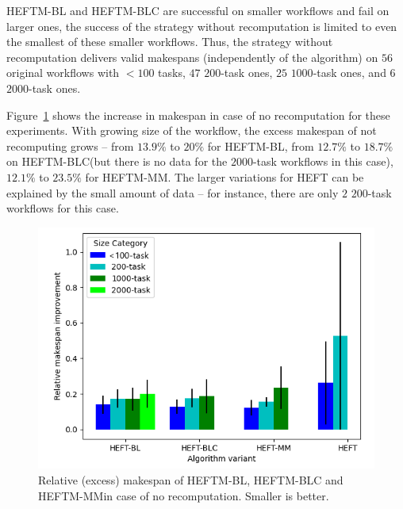 \documentclass[conference]{IEEEtran}
\newcommand{\algo}[1]{\textsc{#1}}
\newcommand{\heft}{\algo{HEFT}\xspace}
\newcommand{\heftmm}{\algo{HEFTM-MM}\xspace}
\newcommand{\heftbl}{\algo{HEFTM-BL}\xspace}
\newcommand{\heftblc}{\algo{HEFTM-BLC}\xspace}
\newcommand{\new}[1]{{\color{blue}#1}}
\begin{document}
\heftbl and \heftblc are successful on smaller workflows and fail on larger ones, 
the success of the strategy without recomputation is limited to even the smallest of these smaller workflows.
Thus, the strategy without recomputation delivers valid makespans (independently of the algorithm) 
on $56$ original workflows with $<100$ tasks, $47$ $200$-task ones, $25$ $1000$-task ones, and $6$ $2000$-task ones.

Figure~\ref{fig:updates-ms} shows the increase in makespan in case of no recomputation for these experiments.
With growing size of the workflow, the excess makespan of not recomputing grows -- from $13.9\%$ to $20\%$ for \heftbl,
from $12.7\%$ to $18.7\%$ on \heftblc (but there is no data for the $2000$-task workflows in this case),
$12.1\%$ to $23.5\%$ for \heftmm.
The larger variations for \heft can be explained by the small amount of data -- for instance, there are
only $2$ $200$-task workflows for this case.

\begin{figure}[tb]
    \centering
    \includegraphics[width=0.95\columnwidth] {images/UpdatesMss2}
    \caption{Relative (excess) makespan of \heftbl, \heftblc and \heftmm \new{in case of no recomputation}. Smaller is better.}
    \label{fig:updates-ms}
\end{figure}
\end{document}
